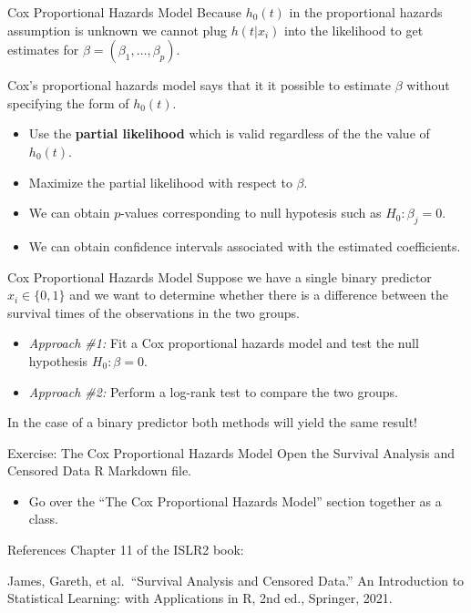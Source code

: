 \documentclass[
  ignorenonframetext,
  aspectratio=169,
]{beamer}
\providecommand{\tightlist}{%
  \setlength{\itemsep}{0pt}\setlength{\parskip}{0pt}}\usepackage{longtable,booktabs,array}
\begin{document}
\begin{frame}{Cox Proportional Hazards Model}
\protect\hypertarget{cox-proportional-hazards-model}{}
Because \(h_0(t)\) in the proportional hazards assumption is unknown we
cannot plug \(h(t|x_i)\) into the likelihood to get estimates for
\(\beta=\left(\beta_{1}, \ldots, \beta_{p}\right)\).

\alert{Cox's proportional hazards model says that it it possible to estimate $\beta$ without specifying the form of $h_0(t)$.}

\begin{itemize}
\item
  Use the \textbf{partial likelihood} which is valid regardless of the
  the value of \(h_0(t)\).
\item
  Maximize the partial likelihood with respect to \(\beta\).
\item
  We can obtain \(p\)-values corresponding to null hypotesis such as
  \(H_0: \beta_j = 0\).
\item
  We can obtain confidence intervals associated with the estimated
  coefficients.
\end{itemize}
\end{frame}

\begin{frame}{Cox Proportional Hazards Model}
\protect\hypertarget{cox-proportional-hazards-model-1}{}
Suppose we have a single binary predictor \(x_i \in \{0, 1\}\) and we
want to determine whether there is a difference between the survival
times of the observations in the two groups.

\begin{itemize}
\item
  \emph{Approach \#1:} Fit a Cox proportional hazards model and test the
  null hypothesis \(H_0: \beta = 0\).
\item
  \emph{Approach \#2:} Perform a log-rank test to compare the two
  groups.
\end{itemize}

In the case of a binary predictor both methods will yield the same
result!
\end{frame}

\begin{frame}{Exercise: The Cox Proportional Hazards Model}
\protect\hypertarget{exercise-the-cox-proportional-hazards-model}{}
Open the Survival Analysis and Censored Data R Markdown file.

\begin{itemize}
\tightlist
\item
  Go over the ``The Cox Proportional Hazards Model'' section together as
  a class.
\end{itemize}
\end{frame}

\begin{frame}{References}
\protect\hypertarget{references}{}
Chapter 11 of the ISLR2 book:

James, Gareth, et al.~``Survival Analysis and Censored Data.'' An
Introduction to Statistical Learning: with Applications in R, 2nd ed.,
Springer, 2021.
\end{frame}
\end{document}
